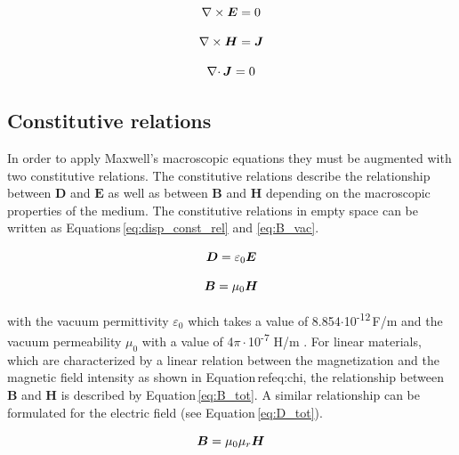 \begin{equation}
\label{eq:Faraday_stat}
\centering
\nabla\times\boldsymbol{E} = 0
\end{equation}

\begin{equation}
\label{eq:Ampere_stat}
\centering
\nabla\times\boldsymbol{H} = \boldsymbol{J} 
\end{equation}

\begin{equation}
\label{eq:Konti_Mag_stat}
\centering
\nabla\cdotp\boldsymbol{J} = 0
\end{equation}

\subsection{Constitutive relations}
\label{subsec:const_rel}

In order to apply Maxwell's macroscopic equations they must be augmented with two constitutive relations. The constitutive relations describe the relationship between $\boldsymbol{D}$ and $\boldsymbol{E}$ as well as between $\boldsymbol{B}$ and $\boldsymbol{H}$ depending on the macroscopic properties of the medium. The constitutive relations in empty space can be written as Equations\,\ref{eq:disp_const_rel} and \ref{eq:B_vac}. 

\begin{equation}
\label{eq:disp_const_rel}
\centering
\boldsymbol{D} = \varepsilon_{0}\boldsymbol{E} 
\end{equation}

\begin{equation}
\label{eq:B_vac}
\centering
\boldsymbol{B} = \mu_{0}\boldsymbol{H}
\end{equation}

with the vacuum permittivity $\varepsilon_{0}$ which takes a value of 8.854$\cdotp$10\textsuperscript{-12}\,F/m and the vacuum permeability $\mu_{0}$ with a value of 4$\pi\cdotp$10\textsuperscript{-7} H/m \cite{monk2003finite,kallenbach2018elektromagnete}. For linear materials, which are characterized by a linear relation between the magnetization and the magnetic field intensity as shown in Equation\,ref{eq:chi}, the relationship between $\boldsymbol{B}$ and $\boldsymbol{H}$ is described by Equation\,\ref{eq:B_tot}. A similar relationship can be formulated for the electric field (see Equation\,\ref{eq:D_tot}).    

\begin{equation}
\label{eq:B_tot}
\centering
\boldsymbol{B} = \mu_{0}\mu_{r}\boldsymbol{H}
\end{equation}

